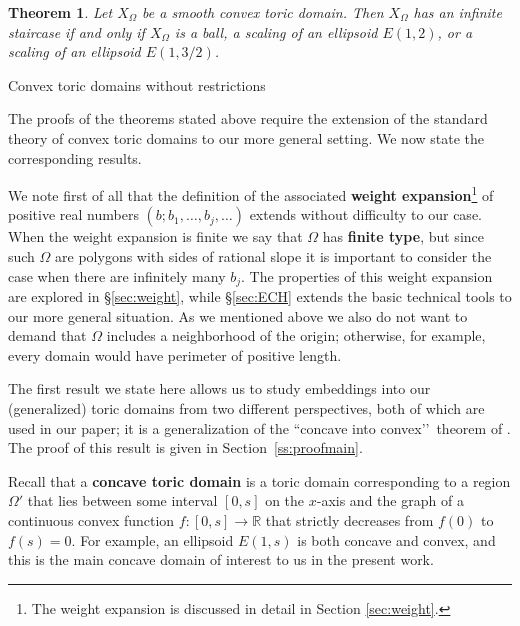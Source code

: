 \documentclass[11pt, reqno]{amsart}
\makeatletter
\def\subsection{\@startsection{subsection}{2}%
  \z@{.75\linespacing\@plus.7\linespacing}{-.5em}%
  {\normalfont\large\bfseries}}
\newtheorem{thm}{Theorem}[subsection]
\theoremstyle{remark}
\numberwithin{equation}{subsection}
\numberwithin{figure}{section}
\theoremstyle{customremark}
\newcommand{\Om}{{\Omega}}
\newcommand{\R}{\mathbb{R}}
\makeatother
\begin{document}
\begin{thm}
\label{thm:class}
Let $X_\Om$ be a smooth convex toric domain.  Then $X_\Om$ has an infinite staircase if and only if $X_\Om$ is a ball, a scaling of an ellipsoid $E(1,2)$, or a scaling of an ellipsoid $E(1,3/2)$.   
\end{thm}


\subsection{Convex toric domains without restrictions}
\label{sec:without}

The proofs of the theorems stated above require the extension of the standard theory of convex toric domains to our more general setting.  We now state the corresponding results.

We note first of all that the definition of the
 associated {\bf weight expansion}\footnote{The weight expansion is discussed in detail in Section \ref{sec:weight}.} of positive real numbers $(b; b_1, \ldots, b_j,\ldots)$  extends  without difficulty to our case.  When the weight expansion is finite we say that $\Omega$ has {\bf finite type}, but since such  $\Om$ are polygons with sides of rational slope it is important to consider the case when there are infinitely many $b_j$. 
The properties of this weight expansion are explored in \S\ref{sec:weight}, while \S\ref{sec:ECH} 
extends the basic technical tools to our more general situation.  
As we mentioned above we also do not want to demand that $\Omega$ includes a neighborhood of the origin;  otherwise, for example, every domain would have  perimeter of positive length. 

  

The first result we state here allows us to study embeddings into our (generalized) toric domains from two different perspectives, both of which are used in our paper; it is a generalization of the ``concave into convex\rq\rq\, theorem of \cite{CG}. The proof of this result is given in Section~\ref{ss:proofmain}. 

Recall that a {\bf concave toric domain} is a toric domain corresponding to a region $\Om'$ that lies between some interval $[0,s]$ on the $x$-axis and the graph of a continuous convex function $f: [0,s]\to \R$ that strictly decreases from $f(0)$ to $f(s)=0$.
For example, an ellipsoid  $E(1,s)$ is both concave and convex, and this is the main concave domain of interest to us in the present work.  
\end{document}
